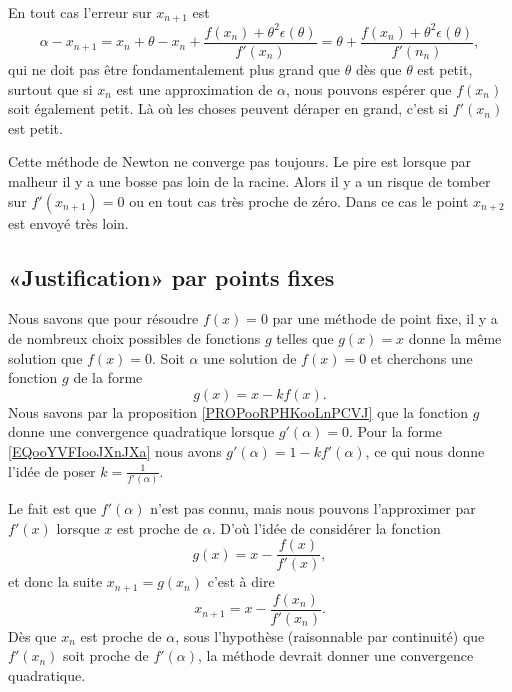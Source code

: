    En tout cas l'erreur sur \( x_{n+1}\) est 
    \begin{equation}
        \alpha-x_{n+1}=x_n+\theta-x_n+\frac{ f(x_n)+\theta^2\epsilon(\theta) }{ f'(x_n) }=\theta+\frac{ f(x_n)+\theta^2\epsilon(\theta) }{ f'(n_n) },
    \end{equation}
    qui ne doit pas être fondamentalement plus grand que \( \theta\) dès que \( \theta\) est petit, surtout que si \( x_n\) est une approximation de \( \alpha\), nous pouvons espérer que \( f(x_n)\) soit également petit. Là où les choses peuvent déraper en grand, c'est si \( f'(x_n)\) est petit.

Cette méthode de Newton ne converge pas toujours. Le pire est lorsque par malheur il y a une bosse pas loin de la racine. Alors il y a un risque de tomber sur \( f'(x_{n+1})=0\) ou en tout cas très proche de zéro. Dans ce cas le point \( x_{n+2}\) est envoyé très loin.

\subsection{«Justification» par points fixes}

Nous savons que pour résoudre \( f(x)=0\) par une méthode de point fixe, il y a de nombreux choix possibles de fonctions \( g\) telles que \( g(x)=x\) donne la même solution que \( f(x)=0\). Soit \( \alpha\) une solution de \( f(x)=0\) et cherchons une fonction \( g\) de la forme
\begin{equation}        \label{EQooYVFIooJXnJXa}
    g(x)=x-kf(x).
\end{equation}
Nous savons par la proposition \ref{PROPooRPHKooLnPCVJ} que la fonction \( g\) donne une convergence quadratique lorsque \( g'(\alpha)=0\). Pour la forme \eqref{EQooYVFIooJXnJXa} nous avons \( g'(\alpha)=1-kf'(\alpha)\), ce qui nous donne l'idée de poser \( k=\frac{1}{ f'(\alpha) }\).

Le fait est que \( f'(\alpha)\) n'est pas connu, mais nous pouvons l'approximer par \( f'(x)\) lorsque \( x\) est proche de \( \alpha\). D'où l'idée de considérer la fonction
\begin{equation}
    g(x)=x-\frac{ f(x) }{ f'(x) },
\end{equation}
et donc la suite \( x_{n+1}=g(x_n)\) c'est à dire
\begin{equation}
    x_{n+1}=x-\frac{ f(x_n) }{ f'(x_n) }.
\end{equation}
Dès que \( x_n\) est proche de \( \alpha\), sous l'hypothèse (raisonnable par continuité) que \( f'(x_n)\) soit proche de \( f'(\alpha)\), la méthode devrait donner une convergence quadratique.

